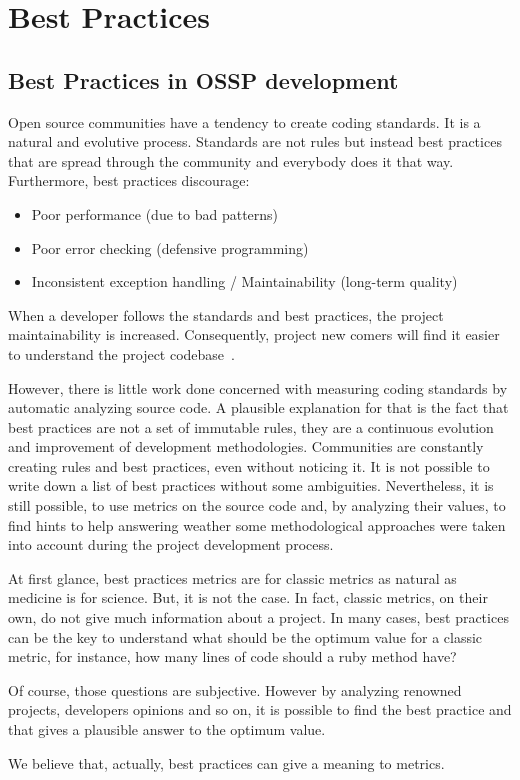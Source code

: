 \thispagestyle{empty}
\chapter{Best Practices}\label{chap:best_practices}


\section{Best Practices in OSSP development} \label{sec:best_practices}
Open source communities have a tendency to create coding standards. It is a natural and evolutive process.
Standards are not rules but instead best practices that are spread through the community and everybody does it that way.
Furthermore, best practices discourage:
\begin{itemize}
\item Poor performance (due to bad patterns)
\item Poor error checking (defensive programming)
\item Inconsistent exception handling / Maintainability (long-term quality)
\end{itemize}
When a developer follows the standards and best practices, the project maintainability is increased.
Consequently, project new comers will find it easier to understand the project codebase~\cite{dromey2002model}.

However, there is little work done concerned with measuring coding standards by automatic analyzing source code.
A plausible explanation for that is the fact that best practices are not a set of immutable rules,
they are a continuous evolution and improvement of development methodologies.
Communities are constantly creating rules and best practices, even without noticing it.
It is not possible to write down a list of best practices without some ambiguities.
Nevertheless, it is still possible, to use metrics on the source code and, by analyzing their values,
to find hints to help answering weather some methodological approaches
were taken into account during the project development process.

At first glance, best practices metrics are for classic metrics as natural as medicine is for science.
But, it is not the case.
In fact, classic metrics, on their own, do not give much information about a project.
In many cases, best practices can be the key to understand what should be the optimum value for a classic metric,
for instance, how many lines of code should a ruby method have?

Of course, those questions are subjective.
However by analyzing renowned projects, developers opinions and so on, it is possible to find the best practice
and that gives a plausible answer to the optimum value.

We believe that, actually, best practices can give a meaning to metrics.